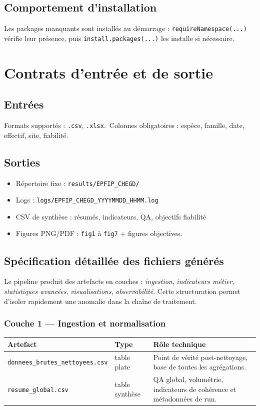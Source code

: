 \documentclass[11pt,a4paper]{article}
\begin{document}
\subsection{Comportement d'installation}
Les packages manquants sont installés au démarrage : \texttt{requireNamespace(...)} vérifie leur présence, puis \texttt{install.packages(...)} les installe si nécessaire.

\section{Contrats d'entrée et de sortie}
\subsection{Entrées}
Formats supportés : \texttt{.csv}, \texttt{.xlsx}.\
Colonnes obligatoires : espèce, famille, date, effectif, site, fiabilité.

\subsection{Sorties}
\begin{itemize}[leftmargin=1.2cm]
  \item Répertoire fixe :
  \texttt{results/EPFIP\_CHEGD/}
  \item Logs :
  \texttt{logs/EPFIP\_CHEGD\_YYYYMMDD\_HHMM.log}
  \item CSV de synthèse : résumés, indicateurs, QA, objectifs fiabilité
  \item Figures PNG/PDF : \texttt{fig1} à \texttt{fig7} + figures objectives.
\end{itemize}

\subsection{Spécification détaillée des fichiers générés}
Le pipeline produit des artefacts en couches : \textit{ingestion},
\textit{indicateurs métier}, \textit{statistiques avancées}, \textit{visualisations},
\textit{observabilité}. Cette structuration permet d'isoler rapidement une anomalie
dans la chaîne de traitement.

\subsubsection{Couche 1 --- Ingestion et normalisation}
\begin{center}\begin{tabular}{p{}p{}p{}}
\toprule
\textbf{Artefact} & \textbf{Type} & \textbf{Rôle technique} \\
\midrule
\texttt{donnees\_brutes\_nettoyees.csv} & table plate & Point de vérité post-nettoyage, base de toutes les agrégations. \\
\texttt{resume\_global.csv} & table synthèse & QA global, volumétrie, indicateurs de cohérence et métadonnées de run. \\
\bottomrule
\end{tabular}\end{center}
\end{document}
